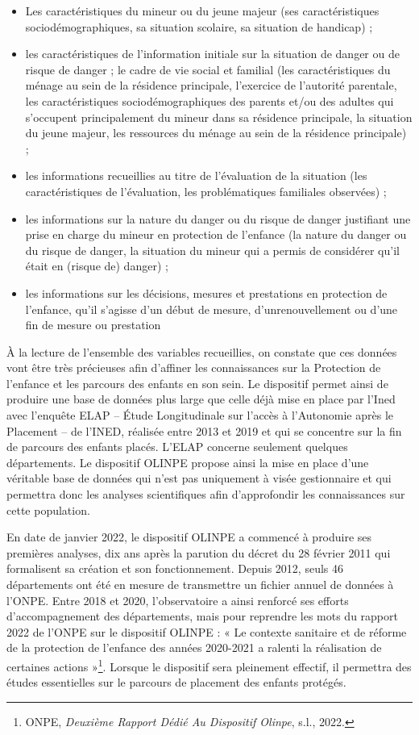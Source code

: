\documentclass[
  12,
  a4paper,
]{report}
\begin{document}
\begin{itemize}
\item
  Les caractéristiques du mineur ou du jeune majeur (ses
  caractéristiques sociodémographiques, sa situation scolaire, sa
  situation de handicap) ;
\item
  les caractéristiques de l'information initiale sur la situation de
  danger ou de risque de danger ; le cadre de vie social et familial
  (les caractéristiques du ménage au sein de la résidence principale,
  l'exercice de l'autorité parentale, les caractéristiques
  sociodémographiques des parents et/ou des adultes qui s'occupent
  principalement du mineur dans sa résidence principale, la situation du
  jeune majeur, les ressources du ménage au sein de la résidence
  principale) ;
\item
  les informations recueillies au titre de l'évaluation de la situation
  (les caractéristiques de l'évaluation, les problématiques familiales
  observées) ;
\item
  les informations sur la nature du danger ou du risque de danger
  justifiant une prise en charge du mineur en protection de l'enfance
  (la nature du danger ou du risque de danger, la situation du mineur
  qui a permis de considérer qu'il était en (risque de) danger) ;
\item
  les informations sur les décisions, mesures et prestations en
  protection de l'enfance, qu'il s'agisse d'un début de mesure,
  d'unrenouvellement ou d'une fin de mesure ou prestation
\end{itemize}

À la lecture de l'ensemble des variables recueillies, on constate que
ces données vont être très précieuses afin d'affiner les connaissances
sur la Protection de l'enfance et les parcours des enfants en son sein.
Le dispositif permet ainsi de produire une base de données plus large
que celle déjà mise en place par l'Ined avec l'enquête ELAP -- Étude
Longitudinale sur l'accès à l'Autonomie après le Placement -- de l'INED,
réalisée entre 2013 et 2019 et qui se concentre sur la fin de parcours
des enfants placés. L'ELAP concerne seulement quelques départements. Le
dispositif OLINPE propose ainsi la mise en place d'une véritable base de
données qui n'est pas uniquement à visée gestionnaire et qui permettra
donc les analyses scientifiques afin d'approfondir les connaissances sur
cette population.

En date de janvier 2022, le dispositif OLINPE a commencé à produire ses
premières analyses, dix ans après la parution du décret du 28 février
2011 qui formalisent sa création et son fonctionnement. Depuis 2012,
seuls 46 départements ont été en mesure de transmettre un fichier annuel
de données à l'ONPE. Entre 2018 et 2020, l'observatoire a ainsi renforcé
ses efforts d'accompagnement des départements, mais pour reprendre les
mots du rapport 2022 de l'ONPE sur le dispositif OLINPE : « Le contexte
sanitaire et de réforme de la protection de l'enfance des années
2020-2021 a ralenti la réalisation de certaines actions »\footnote{ONPE,
  \emph{Deuxième Rapport Dédié Au Dispositif {Olinpe}}, s.l., 2022.}.
Lorsque le dispositif sera pleinement effectif, il permettra des études
essentielles sur le parcours de placement des enfants protégés.
\end{document}

